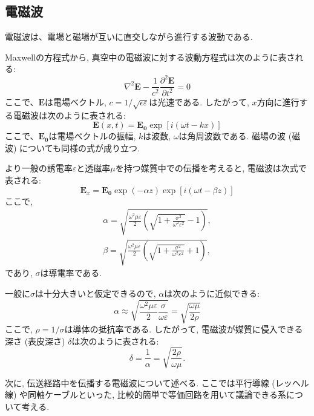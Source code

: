 \documentclass[uplatex,dvipdfmx,a4j,12pt]{jsarticle}
\begin{document}
\subsection{電磁波}
電磁波は、電場と磁場が互いに直交しながら進行する波動である.

Maxwellの方程式から, 真空中の電磁波に対する波動方程式は次のように表される:
\begin{equation}
    \nabla^2 \mathbf{E} - \frac{1}{c^2} \frac{\partial^2 \mathbf{E}}{\partial t^2} = 0
\end{equation}
ここで、$\mathbf{E}$は電場ベクトル, $c = 1/\sqrt{\epsilon\varepsilon}$は光速である.
したがって, $x$方向に進行する電磁波は次のように表される:
\begin{equation}
    \mathbf{E}(x,t) = \mathbf{E_0} \exp{[i(\omega t - kx)]}
\end{equation}
ここで、$\mathbf{E_0}$は電場ベクトルの振幅, $k$は波数, $\omega$は角周波数である.
磁場の波 (磁波) についても同様の式が成り立つ.

より一般の誘電率$\varepsilon$と透磁率$\mu$を持つ媒質中での伝播を考えると, 電磁波は次式で表される:
\begin{equation}
  \mathbf{E}_x = \mathbf{E_0}\exp{(-\alpha z)} \exp{[i(\omega t - \beta z)]}
\end{equation}
ここで, 
\begin{gather}
  \alpha = \sqrt{\frac{\omega^2 \mu \varepsilon}{2} \left(\sqrt{1 + \frac{\sigma^2}{\omega^2 \varepsilon^2}} - 1\right)}, \\
  \beta = \sqrt{\frac{\omega^2 \mu \varepsilon}{2} \left(\sqrt{1 + \frac{\sigma^2}{\omega^2 \varepsilon^2}} + 1\right)},
\end{gather}
であり, $\sigma$は導電率である.

一般に$\sigma$は十分大きいと仮定できるので, $\alpha$は次のように近似できる:
\begin{equation}
  \alpha \approx \sqrt{\frac{\omega^2 \mu \varepsilon}{2} \frac{\sigma}{\omega \varepsilon}} = \sqrt{\frac{\omega \mu}{2 \rho}}
\end{equation}
ここで, $\rho = 1 / \sigma$は導体の抵抗率である.
したがって, 電磁波が媒質に侵入できる深さ (表皮深さ) $\delta$は次のように表される:
\begin{equation}
  \delta = \frac{1}{\alpha} = \sqrt{\frac{2 \rho}{\omega \mu}}.
\end{equation}

\enskip

次に, 伝送経路中を伝播する電磁波について述べる.
ここでは平行導線 (レッヘル線) や同軸ケーブルといった, 比較的簡単で等価回路を用いて議論できる系について考える.
\end{document}
